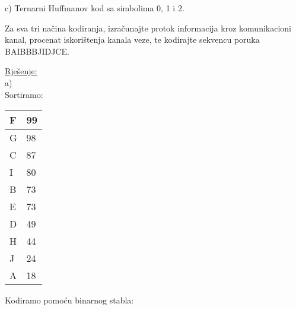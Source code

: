 \documentclass[12pt]{article}
\begin{document}
c) Ternarni Huffmanov kod sa simbolima 0, 1 i 2.

Za sva tri načina kodiranja, izračunajte protok informacija kroz komunikacioni kanal, procenat iskorištenja kanala veze, te kodirajte sekvencu poruka BAIBBBJIDJCE.

\underline{Rješenje:}\\

a)\\

Sortiramo:

\begin{table}[hp]
\centering
\begin{tabular}{|l|l|}
\hline
F & 99 \\ \hline
G & 98 \\ \hline
C & 87 \\ \hline
I & 80 \\ \hline
B & 73 \\ \hline
E & 73 \\ \hline
D & 49 \\ \hline
H & 44 \\ \hline
J & 24 \\ \hline
A & 18 \\ \hline
\end{tabular}
\end{table}

Kodiramo pomoću binarnog stabla:
\end{document}
